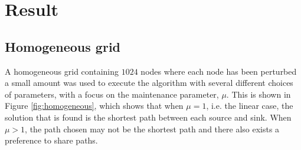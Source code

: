 \section{Result}
\label{sec:result}

\subsection{Homogeneous grid}

A homogeneous grid containing $1024$ nodes where each node has been perturbed a small amount was used to execute the algorithm with several different choices of parameters, with a focus on the maintenance parameter, $\mu$. This is shown in Figure \ref{fig:homogeneous}, which shows that when $\mu = 1$, i.e. the linear case, the solution that is found is the shortest path between each source and sink. When $\mu > 1$, the path chosen may not be the shortest path and there also exists a preference to share paths.

